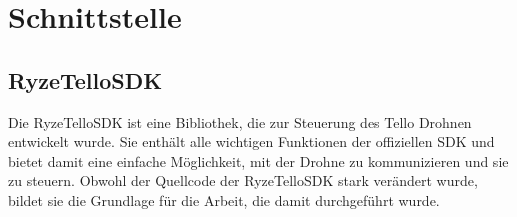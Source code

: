 \section{Schnittstelle}

\subsection{RyzeTelloSDK}
Die RyzeTelloSDK ist eine Bibliothek, die zur Steuerung des Tello Drohnen entwickelt wurde. Sie enthält alle wichtigen Funktionen der offiziellen SDK und bietet damit eine einfache Möglichkeit, mit der Drohne zu kommunizieren und sie zu steuern. Obwohl der Quellcode der RyzeTelloSDK stark verändert wurde, bildet sie die Grundlage für die Arbeit, die damit durchgeführt wurde.